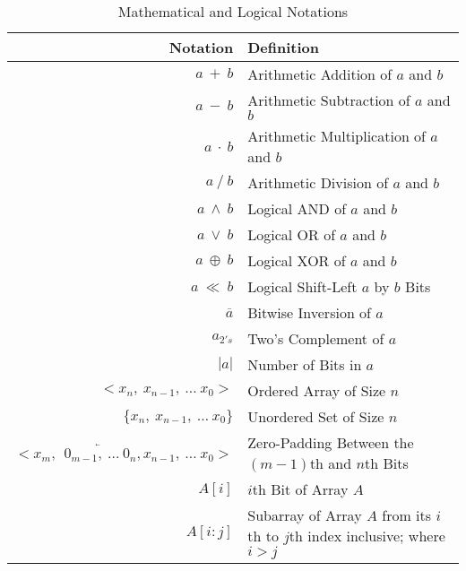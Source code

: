         \begin{table}[h]
            \def\arraystretch{2}
            \caption{Mathematical and Logical Notations}

            \centering
            \begin{tabular*}{470pt}{@{\extracolsep{\fill}} r p{9cm}}

            \textbf{Notation} & \textbf{Definition} \\
            \hline
            $a \ + \ b$ & Arithmetic Addition of $a$ and $b$\\
            $a \ - \ b$ & Arithmetic Subtraction of $a$ and $b$\\
            $a \ \cdot \ b$ & Arithmetic Multiplication of $a$ and $b$\\
            $a \ / \ b$ & Arithmetic Division of $a$ and $b$\\
            $a \ \wedge \ b$ & Logical AND of $a$ and $b$\\
            $a \ \vee \ b$ & Logical OR of $a$ and $b$\\
            $a \ \oplus \ b$ & Logical XOR of $a$ and $b$\\
            $a \ \ll \ b$ & Logical Shift-Left $a$ by $b$ Bits\\
            $\overline{a}$ & Bitwise Inversion of $a$\\
            $a_{2's}$ & Two's Complement of $a$\\
            $|a|$ & Number of Bits in $a$\\
            $<x_{n}, \ x_{n-1}, \ \ldots \ x_{0}>$ & Ordered Array of Size $n$
            \\
            $\{x_{n}, \ x_{n-1}, \ \ldots \ x_{0}\}$ & Unordered Set of Size
            $n$ \\
            $< x_{m}, \ \ \overleftarrow{0_{m-1}, \ \ldots \ 0_{n}}, x_{n-1}, \
            \ldots \ x_{0} >$ & Zero-Padding Between the $(m-1)$th and $n$th
            Bits \\
            $A[i]$ & $i$th Bit of Array $A$ \\
            $A[i:j]$ & Subarray of Array $A$ from its $i$th to $j$th index
            inclusive; where $i > j$ \\

            \end{tabular*}
        \end{table}


    \newpage
